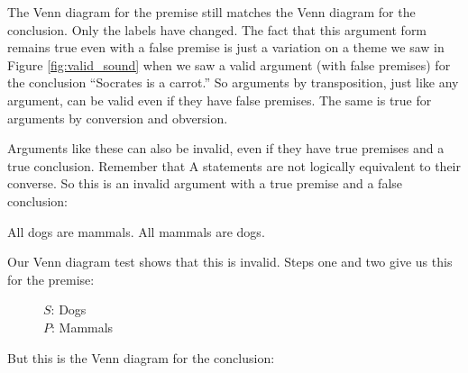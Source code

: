 The Venn diagram for the premise still matches the Venn diagram for the conclusion. Only the labels have changed. The fact that this argument form remains true even with a false premise is just a variation on a theme we saw in 
Figure \ref{fig:valid_sound} when we saw a valid argument (with false premises) for the conclusion ``Socrates is a carrot.'' So arguments by transposition, just like any argument, can be valid even if they have false premises. The same is true for arguments by conversion and obversion. 

Arguments like these can also be invalid, even if they have true premises and a true conclusion. Remember that A statements are not logically equivalent to their converse. So this is an invalid argument with a true premise and a false conclusion:

\begin{earg*}
\item All dogs are mammals.
\itemc[.3] All mammals are dogs. 
\end{earg*}

Our Venn diagram test shows that this is invalid. Steps one and two give us this for the premise:
\begin{figure}[H]
\begin{center}
\end{center}
\captionsetup{singlelinecheck=on}
\caption*{$S$: Dogs \\ $P$: Mammals}
\end{figure}

But this is the Venn diagram for the conclusion:

